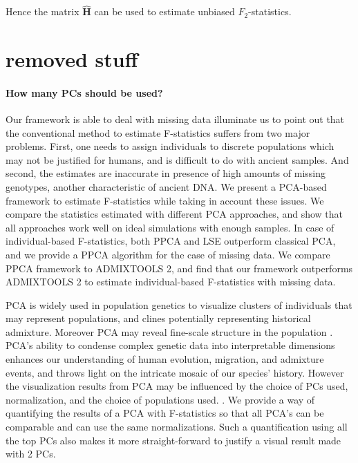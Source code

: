 \documentclass[12pt, letterpaper]{article}
\begin{document}
Hence the matrix $\hat{\mathbf{H}}$ can be used to estimate unbiased $F_2$-statistics.



\section{removed stuff}



\paragraph{How many PCs should be used?}
Our framework is able to deal with missing data illuminate us to point out that the conventional method to estimate F-statistics suffers from two major problems. First, one needs to assign individuals to discrete populations which may not be justified for humans, and is difficult to do with ancient samples. And second, the estimates are inaccurate in presence of high amounts of missing genotypes, another characteristic of ancient DNA. We present a PCA-based framework to estimate F-statistics while taking in account these issues. We compare the statistics estimated with different PCA approaches, and show that all approaches work well on ideal simulations with enough samples. In case of individual-based F-statistics, both PPCA and LSE outperform classical PCA, and we provide a PPCA algorithm for the case of missing data. We compare PPCA framework to ADMIXTOOLS 2, and find that our framework outperforms ADMIXTOOLS 2 to estimate individual-based F-statistics with missing data.

PCA is widely used in population genetics to visualize clusters of individuals that may represent populations, and clines potentially representing historical admixture. Moreover PCA may reveal fine-scale structure in the population \cite{waldman_genome-wide_2022}. PCA's ability to condense complex genetic data into interpretable dimensions enhances our understanding of human evolution, migration, and admixture events, and throws light on the intricate mosaic of our species' history. However the visualization results from PCA may be influenced by the choice of PCs used, normalization, and the choice of populations used. \cite{elhaik_principal_2022}. We provide a way of quantifying the results of a PCA with F-statistics so that all PCA's can be comparable and can use the same normalizations. Such a quantification using all the top PCs also makes it more straight-forward to justify a visual result made with 2 PCs.
\end{document}
